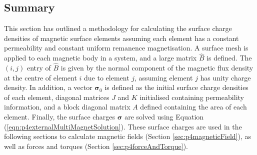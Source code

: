 \subsection{Summary}
This section has outlined a methodology for calculating the surface charge densities of magnetic surface elements assuming each element has a constant permeability and constant uniform remanence magnetisation. A surface mesh is applied to each magnetic body in a system, and a large matrix \(\hat{B}\) is defined. The \(\left(i,j\right)\) entry of \(\hat{B}\) is given by the normal component of the magnetic flux density at the centre of element \(i\) due to element \(j\), assuming element \(j\) has unity charge density. In addition, a vector \(\bm{\sigma}_0\) is defined as the initial surface charge densities of each element, diagonal matrices \(J\) and \(K\) initialised containing permeability information, and a block diagonal matrix \(A\) defined containing the area of each element. Finally, the surface charges \(\bm{\sigma}\) are solved using Equation (\ref{eqn:p4externalMultiMagnetSolution}). These surface charges are used in the following sections to calculate magnetic fields (Section \ref{sec:p4magneticField}), as well as forces and torques (Section \ref{sec:p4forceAndTorque}).
